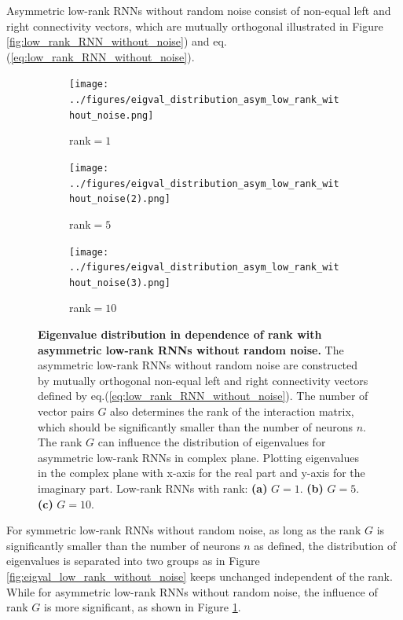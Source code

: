\documentclass[11pt]{article}
\begin{document}
	Asymmetric low-rank RNNs without random noise consist of non-equal left and right connectivity vectors, which are mutually orthogonal illustrated in Figure \ref{fig:low_rank_RNN_without_noise}) and eq.(\ref{eq:low_rank_RNN_without_noise}). 
		\begin{figure}[H]
			\centering
			\begin{subfigure}[b]{0.3\textwidth}
				\centering
				\texttt{[image: ../figures/eigval\_distribution\_asym\_low\_rank\_without\_noise.png]}
				\caption{rank$=1$}
			\end{subfigure}
			\begin{subfigure}[b]{0.3\textwidth}
				\centering
				\texttt{[image: ../figures/eigval\_distribution\_asym\_low\_rank\_without\_noise(2).png]}
				\caption{rank$=5$}
			\end{subfigure}
			\begin{subfigure}[b]{0.3\textwidth}
				\centering
				\texttt{[image: ../figures/eigval\_distribution\_asym\_low\_rank\_without\_noise(3).png]}
				\caption{rank$=10$}
			\end{subfigure}
			\caption{\textbf{Eigenvalue distribution in dependence of rank with asymmetric low-rank RNNs without random noise.} The asymmetric low-rank RNNs without random noise are constructed by mutually orthogonal non-equal left and right connectivity vectors defined by eq.(\ref{eq:low_rank_RNN_without_noise}). The number of vector pairs $G$ also determines the rank of the interaction matrix, which should be significantly smaller than the number of neurons $n$. The rank $G$ can influence the distribution of eigenvalues for asymmetric low-rank RNNs in complex plane. Plotting eigenvalues in the complex plane with x-axis for the real part and y-axis for the imaginary part. Low-rank RNNs with rank: \textbf{(a)} $G=1$. \textbf{(b)} $G=5$. \textbf{(c)} $G=10$. }
			\label{fig:eigval_distribution_asym_low_rank_without_noise}
		\end{figure}
	
	For symmetric low-rank RNNs without random noise, as long as the rank $G$ is significantly smaller than the number of neurons $n$ as defined, the distribution of eigenvalues is separated into two groups as in Figure \ref{fig:eigval_low_rank_without_noise} keeps unchanged independent of the rank. While for asymmetric low-rank RNNs without random noise, the influence of rank $G$ is more significant, as shown in Figure \ref{fig:eigval_distribution_asym_low_rank_without_noise}. 
	
\end{document}
